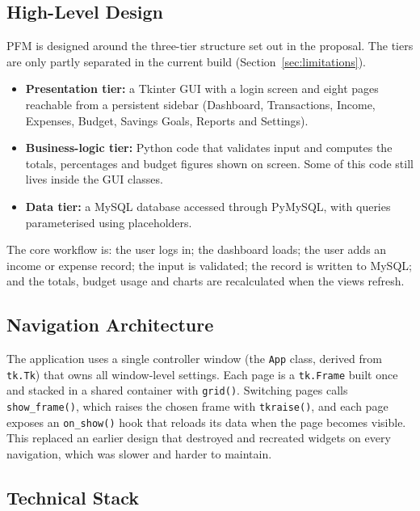 \documentclass{tietreport}
\begin{document}
\subsection{High-Level Design}

PFM is designed around the three-tier structure set out in the
proposal. The tiers are only partly separated in the current
build (Section~\ref{sec:limitations}).

\begin{itemize}
  \item \textbf{Presentation tier:} a Tkinter GUI with a login
    screen and eight pages reachable from a persistent sidebar
    (Dashboard, Transactions, Income, Expenses, Budget, Savings
    Goals, Reports and Settings).
  \item \textbf{Business-logic tier:} Python code that validates
    input and computes the totals, percentages and budget figures
    shown on screen. Some of this code still lives inside the GUI
    classes.
  \item \textbf{Data tier:} a MySQL database accessed through
    PyMySQL, with queries parameterised using placeholders.
\end{itemize}

The core workflow is: the user logs in; the dashboard loads;
the user adds an income or expense record; the input is
validated; the record is written to MySQL; and the totals,
budget usage and charts are recalculated when the views refresh.

\subsection{Navigation Architecture}

The application uses a single controller window (the \texttt{App}
class, derived from \texttt{tk.Tk}) that owns all window-level
settings. Each page is a \texttt{tk.Frame} built once and stacked
in a shared container with \texttt{grid()}. Switching pages calls
\texttt{show\_frame()}, which raises the chosen frame with
\texttt{tkraise()}, and each page exposes an \texttt{on\_show()}
hook that reloads its data when the page becomes visible. This
replaced an earlier design that destroyed and recreated widgets on
every navigation, which was slower and harder to maintain.

\subsection{Technical Stack}
\end{document}
